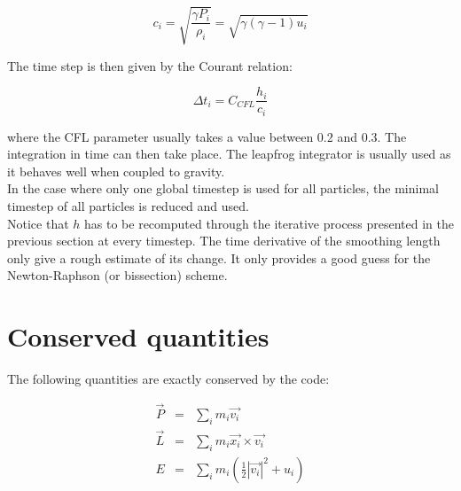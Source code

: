 \documentclass[a4paper,10pt]{article}
\begin{document}
\begin{equation}
 c_i = \sqrt{\frac{\gamma P_i}{\rho_i}} = \sqrt{\gamma (\gamma-1)u_i}
\end{equation}

The time step is then given by the Courant relation:

\begin{equation}
 \Delta t_i = C_{CFL} \frac{h_i}{c_i}
\end{equation}

where the CFL parameter usually takes a value between $0.2$ and $0.3$. The integration in time can then take place. The
leapfrog integrator is usually used as it behaves well when coupled to gravity. \\
In the case where only one global timestep is used for all particles, the minimal timestep of all particles is reduced
and used. \\

Notice that $h$ has to be recomputed through the iterative process
presented in the previous section at every timestep. The time
derivative of the smoothing length only give a rough estimate of its
change. It only provides a good guess for the Newton-Raphson (or
bissection) scheme.

\section{Conserved quantities}

The following quantities are exactly conserved by the code:

\begin{eqnarray}
\vec{P} &=&\sum_i m_i \vec{v_i}\\
\vec{L} &=& \sum_i m_i \vec{x_i} \times \vec{v_i}\\ 
E &=&\sum_i m_i\left(\frac{1}{2}|\vec{v_i}|^2+u_i\right)
\end{eqnarray}
\end{document}
